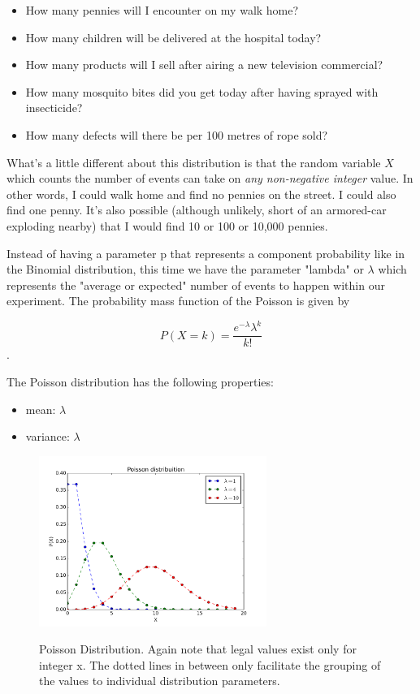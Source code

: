 \begin{itemize}
  \item How many pennies will I encounter on my walk home?
  \item How many children will be delivered at the hospital today?
  \item How many products will I sell after airing a new television commercial?
  \item How many mosquito bites did you get today after having sprayed with insecticide?
  \item How many defects will there be per 100 metres of rope sold?
\end{itemize}

What's a little different about this distribution is that the random variable $X$ which counts the number of events can take on \emph{any non-negative integer} value. In other words, I could walk home and find no pennies on the street. I could also find one penny. It's also possible (although unlikely, short of an armored-car exploding nearby) that I would find 10 or 100 or 10,000 pennies.

Instead of having a parameter p that represents a component probability like in the Binomial distribution, this time we have the parameter "lambda" or $\lambda$ which represents the "average or expected" number of events to happen within our experiment. The probability mass function of the Poisson is given by

\begin{equation}
  P(X=k)=\frac{e^{-\lambda}\lambda^k}{k!}
\end{equation}.

The Poisson distribution has the following properties:

\begin{itemize}
    \item mean: $\lambda$
    \item variance: $\lambda$
\end{itemize}

\begin{figure}
  \centering
  \includegraphics[width=0.66\textwidth]{../Images/Poisson_distribution_pmf.png}\\
  \caption{Poisson Distribution. Again note that legal values exist only for integer x. The dotted lines in between only facilitate the grouping of the values to individual distribution parameters.}
\end{figure}


